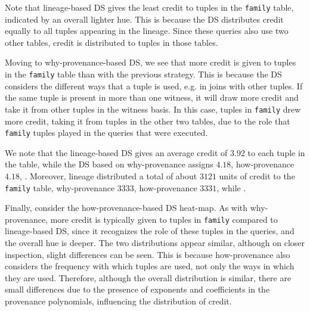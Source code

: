 Note that lineage-based DS gives the least credit to tuples in the \texttt{family} table, indicated by an overall lighter hue. This is because the DS  distributes credit equally to all tuples appearing in the lineage. Since these queries also use two other tables, credit is distributed to tuples in those tables.

Moving to why-provenance-based DS, we see that more credit is given to tuples in the \texttt{family} table than with the previous strategy. This is because the DS considers the different ways that a tuple is used, e.g. in joins with other tuples. If the same tuple is present in more than one witness, it will draw more credit and take it from  other tuples in the witness basis. In this case, tuples in \texttt{family} drew more credit, taking it from tuples in the other two tables, due to the role that \texttt{family}  tuples played in the queries that were executed. 

We note that the lineage-based DS gives an average credit of $3.92$ to each tuple in the table, while the DS based on why-provenance assigns $4.18$, how-provenance $4.18$, . 
Moreover, lineage distributed a total of about $3121$ units of credit to the \texttt{family} table, why-provenance $3333$, how-provenance $3331$, while . 

Finally, consider the how-provenance-based DS heat-map. %
As with why-provenance, more credit is typically given to tuples in \texttt{family} compared to lineage-based DS, since it recognizes the role of these tuples in the queries, and the overall hue is deeper.  
The two distributions appear similar, although on closer inspection, slight differences can be seen. 
This is because how-provenance also considers the frequency with which tuples are used, not only the ways in which they are used. Therefore, although the overall distribution is similar, there are small differences due to the presence of exponents and coefficients in the provenance polynomials, influencing the distribution of credit. 

